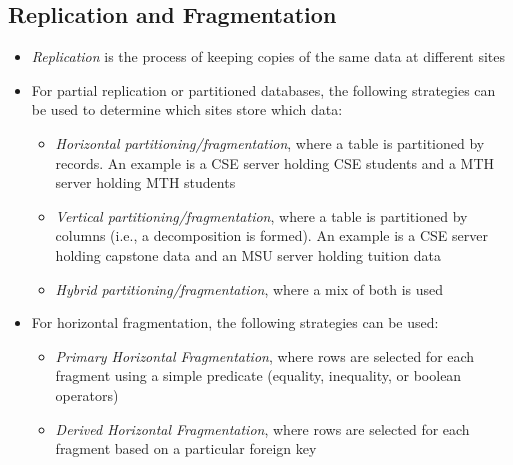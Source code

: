 \documentclass[a4paper]{article}
\begin{document}
\subsection{Replication and Fragmentation}
\begin{itemize}
    \item \emph{Replication} is the process of keeping copies of the same data at different sites
    \item For partial replication or partitioned databases, the following strategies can be used to determine which sites store which data:
    \begin{itemize}
    \item \emph{Horizontal partitioning/fragmentation}, where a table is partitioned by records. An example is a CSE server holding CSE students and a MTH server holding MTH students
    \item \emph{Vertical partitioning/fragmentation}, where a table is partitioned by columns (i.e., a decomposition is formed). An example is a CSE server holding capstone data and an MSU server holding tuition data
    \item \emph{Hybrid partitioning/fragmentation}, where a mix of both is used
    \end{itemize}
    \item For horizontal fragmentation, the following strategies can be used:
    \begin{itemize}
    \item \emph{Primary Horizontal Fragmentation}, where rows are selected for each fragment using a simple predicate (equality, inequality, or boolean operators)
    \item \emph{Derived Horizontal Fragmentation}, where rows are selected for each fragment based on a particular foreign key
    \end{itemize}
\end{itemize}
\end{document}
